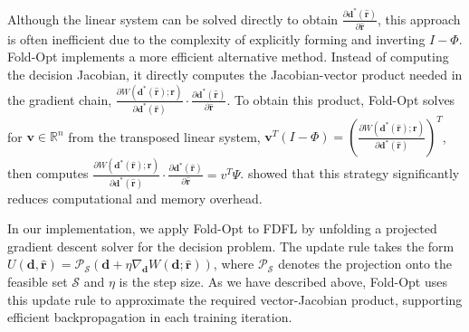 \documentclass[ijoc,sglanonrev]{informs4}
\begin{document}
Although the linear system can be solved directly to obtain $\frac{\partial \mathbf{d}^*(\hat{\mathbf{r}})}{\partial \hat{\mathbf{r}}}$, this approach is often inefficient due to the complexity of explicitly forming and inverting $I - \Phi$. Fold-Opt implements a more efficient alternative method. Instead of computing the decision Jacobian, it directly computes the Jacobian-vector product needed in the gradient chain, $\frac{\partial W(\mathbf{d}^*(\hat{\mathbf{r}});\mathbf{r})}{\partial \mathbf{d}^*(\hat{\mathbf{r}})} \cdot \frac{\partial \mathbf{d}^*(\hat{\mathbf{r}})}{\partial \hat{\mathbf{r}}}$. 
To obtain this product, Fold-Opt solves for $\mathbf{v} \in \mathbb{R}^n$ from the transposed linear system, $\mathbf{v}^T (I - \Phi) = (\frac{\partial W(\mathbf{d}^*(\hat{\mathbf{r}});\mathbf{r})}{\partial \mathbf{d}^*(\hat{\mathbf{r}})})^T$, then computes $\frac{\partial W(\mathbf{d}^*(\hat{\mathbf{r}});\mathbf{r})}{\partial \mathbf{d}^*(\hat{\mathbf{r}})} \cdot \frac{\partial \mathbf{d}^*(\hat{\mathbf{r}})}{\partial \hat{\mathbf{r}}} = v^T \Psi$. \cite{kotaryfoldopt2023} showed that this strategy significantly reduces computational and memory overhead. 

In our implementation, we apply Fold-Opt to FDFL by unfolding a projected gradient descent solver for the decision problem. The update rule takes the form $U(\mathbf{d}, \hat{\mathbf{r}}) = \mathcal{P}_{\mathcal{S}}(\mathbf{d} + \eta \nabla_{\mathbf{d}} W(\mathbf{d}; \hat{\mathbf{r}}))$, where $\mathcal{P}_{\mathcal{S}}$ denotes the projection onto the feasible set $\mathcal{S}$ and $\eta$ is the step size. As we have described above, Fold-Opt uses this update rule to approximate the required vector-Jacobian product, supporting efficient backpropagation in each training iteration.


\end{document}
